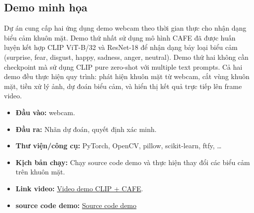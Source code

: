 \subsection{Demo minh họa}
Dự án cung cấp hai ứng dụng demo webcam theo thời gian thực cho nhận dạng biểu cảm khuôn mặt. Demo thứ nhất  sử dụng mô hình CAFE đã được huấn luyện kết hợp CLIP ViT-B/32 và ResNet-18 để nhận dạng bảy loại biểu cảm (surprise, fear, disgust, happy, sadness, anger, neutral). Demo thứ hai không cần checkpoint mà sử dụng CLIP pure zero-shot với multiple text prompts. Cả hai demo đều thực hiện quy trình: phát hiện khuôn mặt từ webcam, cắt vùng khuôn mặt, tiền xử lý ảnh, dự đoán biểu cảm, và hiển thị kết quả trực tiếp lên frame video.

\begin{itemize}
    \item \textbf{Đầu vào:}  webcam.
    \item \textbf{Đầu ra:} Nhãn dự đoán, quyết định xác minh.
    \item \textbf{Thư viện/công cụ:} PyTorch, OpenCV, pillow, scikit-learn, ftfy, \dots
    \item \textbf{Kịch bản chạy:} Chạy source code demo và thực hiện thay đổi các biểu cảm trên khuôn mặt.
    \item \textbf{Link video:} \href{https://drive.google.com/drive/folders/1BC7GI7or8lLDn4QfEYbvI_TSbq7936Fp}{Video demo CLIP + CAFE}.
    \item \textbf{source code demo:} \href{https://github.com/DinhLiu/Generalizable-FER}{Source code demo}
\end{itemize}